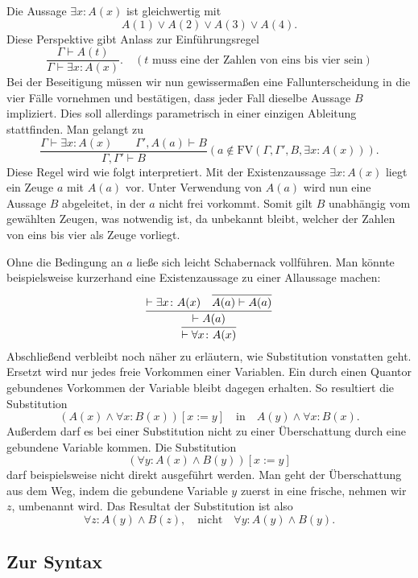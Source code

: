 Die Aussage $\exists x\colon A(x)$ ist gleichwertig mit
\[A(1)\lor A(2)\lor A(3)\lor A(4).\]
Diese Perspektive gibt Anlass zur Einführungsregel
\[\dfrac{\Gamma\vdash A(t)}{\Gamma\vdash\exists x\colon A(x)}.\quad
(\text{$t$ muss eine der Zahlen von eins bis vier sein})\]
Bei der Beseitigung müssen wir nun gewissermaßen eine Fallunterscheidung
in die vier Fälle vornehmen und bestätigen, dass jeder Fall dieselbe
Aussage $B$ impliziert. Dies soll allerdings parametrisch in einer
einzigen Ableitung stattfinden. Man gelangt zu
\[\dfrac{\Gamma\vdash\exists x\colon A(x)\qquad\Gamma',A(a)\vdash B}
{\Gamma,\Gamma'\vdash B}(a\notin\mathrm{FV}(\Gamma,\Gamma',B,\exists x\colon A(x))).\]
Diese Regel wird wie folgt interpretiert. Mit der Existenzaussage
$\exists x\colon A(x)$ liegt ein Zeuge $a$ mit $A(a)$ vor. Unter
Verwendung von $A(a)$ wird nun eine Aussage $B$ abgeleitet, in der $a$
nicht frei vorkommt. Somit gilt $B$ unabhängig vom gewählten Zeugen,
was notwendig ist, da unbekannt bleibt, welcher der Zahlen von eins
bis vier als Zeuge vorliegt.

Ohne die Bedingung an $a$ ließe sich leicht Schabernack vollführen.
Man könnte beispielsweise kurzerhand eine Existenzaussage zu einer
Allaussage machen:
\[\infer{\vdash\forall x\colon A(x)}{
  \infer{\vdash A(a)}{
    \vdash \exists x\colon A(x)
  & \infer{A(a)\vdash A(a)}{}}}\]
Abschließend verbleibt noch näher zu erläutern, wie Substitution
vonstatten geht. Ersetzt wird nur jedes freie Vorkommen einer
Variablen. Ein durch einen Quantor gebundenes Vorkommen der Variable
bleibt dagegen erhalten. So resultiert die Substitution
\[(A(x)\land\forall x: B(x))[x:=y]\quad\text{in}\quad
A(y)\land\forall x\colon B(x).\]
Außerdem darf es bei einer Substitution nicht zu einer Überschattung
durch eine gebundene Variable kommen. Die Substitution
\[(\forall y\colon A(x)\land B(y))[x:=y]\]
darf beispielsweise nicht direkt ausgeführt werden. Man geht der
Überschattung aus dem Weg, indem die gebundene Variable $y$ zuerst
in eine frische, nehmen wir $z$, umbenannt wird. Das Resultat der
Substitution ist also
\[\forall z\colon A(y)\land B(z),\quad\text{nicht}\quad
\forall y\colon A(y)\land B(y).\]

\subsection{Zur Syntax}

